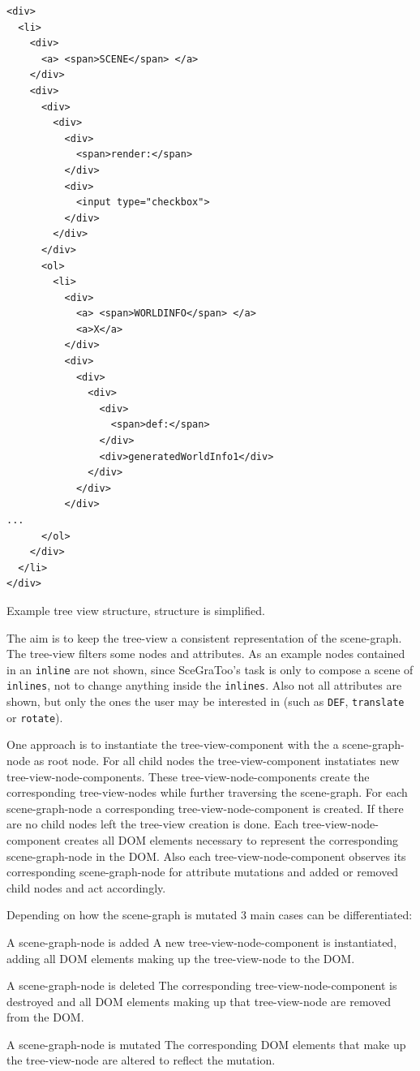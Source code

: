 \begin{listing}
  \begin{verbatim}
<div>
  <li>
    <div>
      <a> <span>SCENE</span> </a>
    </div>
    <div>
      <div>
        <div>
          <div>
            <span>render:</span>
          </div>
          <div>
            <input type="checkbox">
          </div>
        </div>
      </div>
      <ol>
        <li>
          <div>
            <a> <span>WORLDINFO</span> </a>
            <a>X</a>
          </div>
          <div>
            <div>
              <div>
                <div>
                  <span>def:</span>
                </div>
                <div>generatedWorldInfo1</div>
              </div>
            </div>
          </div>
...
      </ol>
    </div>
  </li>
</div>
  \end{verbatim}
  \caption{Example tree view structure, structure is simplified.}
  \label{list:tree-view}
\end{listing}

The aim is to keep the tree-view a consistent representation of the scene-graph.
The tree-view filters some nodes and attributes. As an example nodes contained
in an \texttt{inline} are not shown, since  SceGraToo's task is only to compose
a scene of \texttt{inlines}, not to change anything inside the \texttt{inlines}.
Also not all attributes are shown, but only the ones the user may be interested
in (such as \texttt{DEF}, \texttt{translate} or \texttt{rotate}).

One approach is to instantiate the tree-view-component with the a
scene-graph-node as root node. For all child nodes the tree-view-component
instatiates new tree-view-node-components. These tree-view-node-components
create the corresponding tree-view-nodes while further traversing the
scene-graph. For each scene-graph-node a corresponding tree-view-node-component
is created. If there are no child nodes left the tree-view creation is done.
Each tree-view-node-component creates all \gls{DOM} elements necessary to represent
the corresponding scene-graph-node in the \gls{DOM}. Also each
tree-view-node-component observes its corresponding scene-graph-node for
attribute mutations and added or removed child nodes and act accordingly.

Depending on how the scene-graph is mutated 3 main cases can be differentiated:

\begin{description*}
  \item[A scene-graph-node is added]
    A new tree-view-node-component is instantiated, adding all \gls{DOM} elements making up the tree-view-node to the \gls{DOM}.
  \item[A scene-graph-node is deleted]
    The corresponding tree-view-node-component is destroyed and all \gls{DOM} elements making up that tree-view-node are removed from the \gls{DOM}.
  \item[A scene-graph-node is mutated]
    The corresponding \gls{DOM} elements that make up the  tree-view-node are altered to reflect the mutation.
\end{description*}

